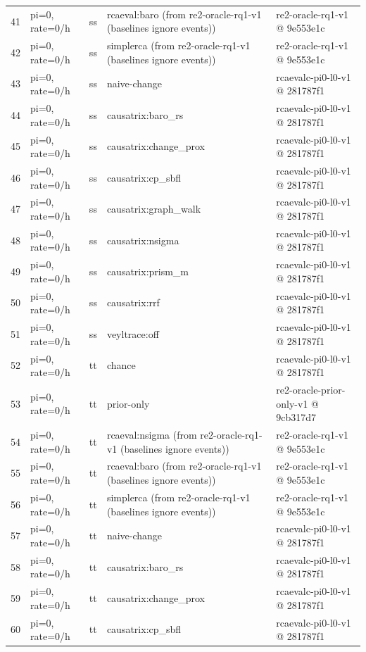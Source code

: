 \begin{longtable}{@{}r>{\raggedright\arraybackslash}p{48.0pt}>{\raggedright\arraybackslash}p{18.0pt}>{\raggedright\arraybackslash}p{108.0pt}>{\raggedright\arraybackslash}p{105.0pt}@{}}
41 & pi=0, rate=0/h & ss & rcaeval:baro (from re2-oracle-rq1-v1 (baselines ignore events)) & re2-oracle-rq1-v1 @ 9e553e1c \\
42 & pi=0, rate=0/h & ss & simplerca (from re2-oracle-rq1-v1 (baselines ignore events)) & re2-oracle-rq1-v1 @ 9e553e1c \\
43 & pi=0, rate=0/h & ss & naive-change & rcaevalc-pi0-l0-v1 @ 281787f1 \\
44 & pi=0, rate=0/h & ss & causatrix:baro\_rs & rcaevalc-pi0-l0-v1 @ 281787f1 \\
45 & pi=0, rate=0/h & ss & causatrix:change\_prox & rcaevalc-pi0-l0-v1 @ 281787f1 \\
46 & pi=0, rate=0/h & ss & causatrix:cp\_sbfl & rcaevalc-pi0-l0-v1 @ 281787f1 \\
47 & pi=0, rate=0/h & ss & causatrix:graph\_walk & rcaevalc-pi0-l0-v1 @ 281787f1 \\
48 & pi=0, rate=0/h & ss & causatrix:nsigma & rcaevalc-pi0-l0-v1 @ 281787f1 \\
49 & pi=0, rate=0/h & ss & causatrix:prism\_m & rcaevalc-pi0-l0-v1 @ 281787f1 \\
50 & pi=0, rate=0/h & ss & causatrix:rrf & rcaevalc-pi0-l0-v1 @ 281787f1 \\
51 & pi=0, rate=0/h & ss & veyltrace:off & rcaevalc-pi0-l0-v1 @ 281787f1 \\
52 & pi=0, rate=0/h & tt & chance & rcaevalc-pi0-l0-v1 @ 281787f1 \\
53 & pi=0, rate=0/h & tt & prior-only & re2-oracle-prior-only-v1 @ 9cb317d7 \\
54 & pi=0, rate=0/h & tt & rcaeval:nsigma (from re2-oracle-rq1-v1 (baselines ignore events)) & re2-oracle-rq1-v1 @ 9e553e1c \\
55 & pi=0, rate=0/h & tt & rcaeval:baro (from re2-oracle-rq1-v1 (baselines ignore events)) & re2-oracle-rq1-v1 @ 9e553e1c \\
56 & pi=0, rate=0/h & tt & simplerca (from re2-oracle-rq1-v1 (baselines ignore events)) & re2-oracle-rq1-v1 @ 9e553e1c \\
57 & pi=0, rate=0/h & tt & naive-change & rcaevalc-pi0-l0-v1 @ 281787f1 \\
58 & pi=0, rate=0/h & tt & causatrix:baro\_rs & rcaevalc-pi0-l0-v1 @ 281787f1 \\
59 & pi=0, rate=0/h & tt & causatrix:change\_prox & rcaevalc-pi0-l0-v1 @ 281787f1 \\
60 & pi=0, rate=0/h & tt & causatrix:cp\_sbfl & rcaevalc-pi0-l0-v1 @ 281787f1 \\

\end{longtable}
